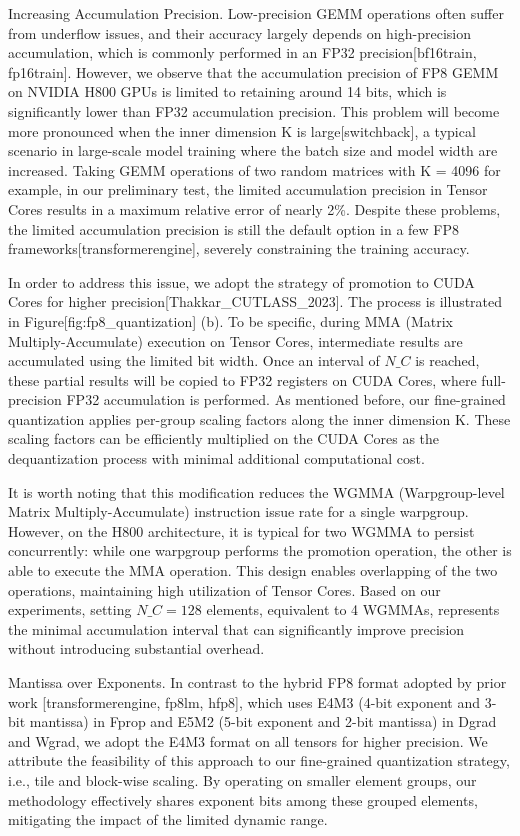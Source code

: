 \documentclass[11pt,a4paper]{article}
\begin{document}
Increasing Accumulation Precision.
Low-precision GEMM operations often suffer from underflow issues, and their accuracy largely depends on high-precision accumulation, which is commonly performed in an FP32 precision[bf16train, fp16train].
However, we observe that the accumulation precision of FP8 GEMM on NVIDIA H800 GPUs is limited to retaining around 14 bits, which is significantly lower than FP32 accumulation precision. 
This problem will become more pronounced when the inner dimension K is large[switchback], a typical scenario in large-scale model training where the batch size and model width are increased. 
Taking GEMM operations of two random matrices with K = 4096 for example, in our preliminary test, the limited accumulation precision in Tensor Cores results in a maximum relative error of nearly 2\%. 
Despite these problems, the limited accumulation precision is still the default option in a few FP8 frameworks[transformerengine], severely constraining the training accuracy.

In order to address this issue, we adopt the strategy of promotion to CUDA Cores for higher precision[Thakkar\_CUTLASS\_2023]. 
The process is illustrated in Figure[fig:fp8\_quantization] (b). 
To be specific, during MMA (Matrix Multiply-Accumulate) execution on Tensor Cores, intermediate results are accumulated using the limited bit width. 
Once an interval of $N\_C$ is reached, these partial results will be copied to FP32 registers on CUDA Cores, where full-precision FP32 accumulation is performed.
As mentioned before, our fine-grained quantization applies per-group scaling factors along the inner dimension K. 
These scaling factors can be efficiently multiplied on the CUDA Cores as the dequantization process with minimal additional computational cost.

It is worth noting that this modification reduces the WGMMA (Warpgroup-level Matrix Multiply-Accumulate) instruction issue rate for a single warpgroup. However, on the H800 architecture, it is typical for two WGMMA to persist concurrently: while one warpgroup performs the promotion operation, the other is able to execute the MMA operation. This design enables overlapping of the two operations, maintaining high utilization of Tensor Cores.
Based on our experiments, setting $N\_C=128$ elements, equivalent to 4 WGMMAs, represents the minimal accumulation interval that can significantly improve precision without introducing substantial overhead.

Mantissa over Exponents. 
In contrast to the hybrid FP8 format adopted by prior work [transformerengine, fp8lm, hfp8], which uses E4M3 (4-bit exponent and 3-bit mantissa) in Fprop and E5M2 (5-bit exponent and 2-bit mantissa) in Dgrad and Wgrad, we adopt the E4M3 format on all tensors for higher precision. 
We attribute the feasibility of this approach to our fine-grained quantization strategy, i.e., tile and block-wise scaling. 
By operating on smaller element groups, our methodology effectively shares exponent bits among these grouped elements, mitigating the impact of the limited dynamic range.
\end{document}
